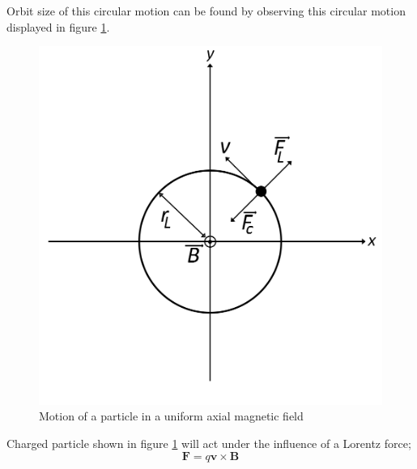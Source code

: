 
 Orbit size of this circular motion can be found by observing this circular motion displayed in figure \ref{fig:larmor}.

\begin{figure}[ht]
    \centering
    \includegraphics[scale=0.25]{fig/larmor.png}
    \caption{Motion of a particle in a uniform axial magnetic field}
    \label{fig:larmor}
\end{figure}

Charged particle shown in figure \ref{fig:larmor} will act under the influence of a Lorentz force;
\begin{equation}
    \mathbf{F} = q\mathbf{v} \times \mathbf{B}
    \label{eq:circularlorentz}
\end{equation}

